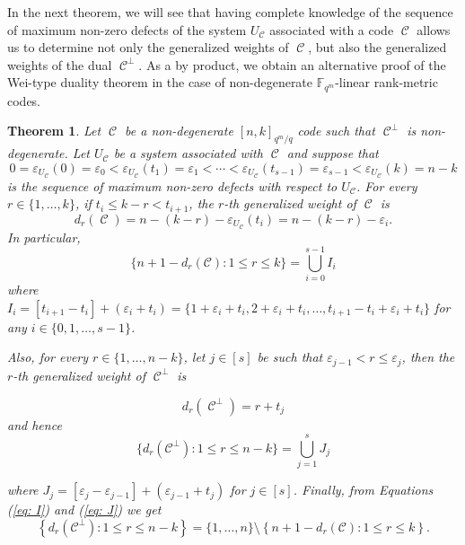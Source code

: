 \documentclass[11pt]{amsart}
\DeclareMathOperator{\C}{\mathcal{C}}
\newtheorem{theorem}{Theorem}[section]
\newcommand{\fqm}{\mathbb{F}_{q^m}}
\begin{document}
In the next theorem, we will see that having complete knowledge of the sequence of maximum non-zero defects of the system $U_{\C}$ associated with a code $\C$ allows us to determine not only the generalized weights of $\C$, but also the generalized weights of the dual $\C^{\perp}$. As a by product, we obtain an alternative proof of the Wei-type duality theorem in the case of non-degenerate $\fqm$-linear rank-metric codes.

\begin{theorem} \label{thm:generalizedweightduality}
    Let $\C$ be a non-degenerate $[n,k]_{q^m/q}$ code such that $\C^{\perp}$ is non-degenerate. 
    Let $U_{\C}$ be a system associated with $\C$ and suppose that
    \[0=\varepsilon_{U_{\C}}(0)=\varepsilon_0< \varepsilon_{U_{\C}}(t_1)=\varepsilon_1 < \cdots < \varepsilon_{U_{\C}}(t_{s-1})=\varepsilon_{s-1}<\varepsilon_{U_{\C}}(k)=n-k
    \]
    is the sequence of maximum non-zero defects with respect to $U_{\C}$. For every $r\in \{1,\ldots,k\}$, if $t_i\leq k-r <t_{i+1}$, the $r$-th generalized weight of $\C$ is
   \begin{equation} \label{eq:gen_weight_maximum_defect}
       d_r(\C)=n-(k-r)-\varepsilon_{U_{\C}}(t_i)=n-(k-r)-\varepsilon_{i}. \end{equation} 
    In particular,
    \begin{equation} \label{eq: I}
        \{n+1-d_r(\mathcal{C})\colon 1 \leq r \leq k\}=\bigcup_{i=0}^{s-1} I_i
    \end{equation}
    where 
    $I_i=[t_{i+1}-t_i]+(\varepsilon_i+t_i)=\{1+\varepsilon_i+t_i,2+\varepsilon_i+t_i,\dots, t_{i+1}-t_i+\varepsilon_i+t_i\}$ for any $ i\in  \{0,1,\dots,s-1\}$.
    
    Also, for every $r \in \{1,\ldots,n-k\}$, let $j \in [s]$ be such that $\varepsilon_{j-1}< r\leq \varepsilon_{j}$, then the $r$-th generalized weight of $\C^\perp$ is

    
    \begin{equation} \label{eq:dualgeneralized weight}       
d_r(\C^\perp)=r+t_{j} 
     \end{equation}
and hence
\begin{equation} \label{eq: J}
 \{d_r(\mathcal{C}^\perp)\colon 1 \leq r \leq n-k\}=\bigcup_{j=1}^{s} J_j
\end{equation}

 where 
    $J_j=[\varepsilon_{j}-\varepsilon_{j-1}]+(\varepsilon_{j-1}+t_j)$ for $j\in [s]$.
    Finally, from Equations (\ref{eq: I}) and (\ref{eq: J}) we get
\[
            \left\{d_r(\mathcal{C}^\perp)\colon 1 \leq r \leq n-k\right\}=\{1, \ldots, n\}\setminus\left\{n+1-d_r(\mathcal{C})\colon 1 \leq r \leq k\right\}.
            \]    
    
\end{theorem}
\end{document}
